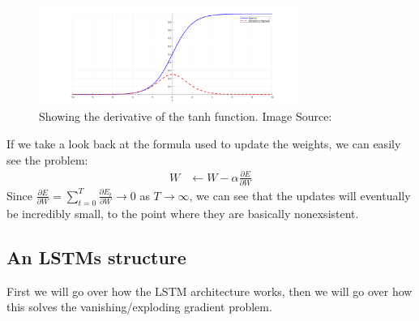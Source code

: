 \begin{figure}[h]
    \centering
        \includegraphics[width=0.75\textwidth]{latex/imgs/tanh_deriv.png}
    \caption{Showing the derivative of the tanh function. Image Source:\cite{grad}}
    \label{fig:tanh_deriv}
\end{figure}
If we take a look back at the formula used to update the weights, we can easily see the problem:
\begin{align}
    W &\leftarrow W - \alpha \frac{\partial E}{\partial W}
\end{align}
Since $\frac{\partial E}{\partial W} = \sum_{t=0}^{T} \frac{\partial E_t}{\partial W} \rightarrow 0$ as $T \rightarrow \infty$, we can see that the updates will eventually be incredibly small, to the point where they are basically nonexsistent.

\subsection{An LSTMs structure}
First we will go over how the LSTM architecture works, then we will go over how this solves the vanishing/exploding gradient problem.\\

